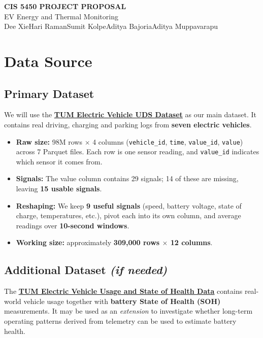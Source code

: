 \documentclass[11pt,letterpaper]{article}
\newcommand{\weblink}[2]{\href{#1}{\underline{#2}}}
\begin{document}
\thispagestyle{fancy}
\begin{center}
  {\LARGE\bfseries CIS 5450 PROJECT PROPOSAL}\\[4pt]
  {\large EV Energy and Thermal Monitoring}\\[4pt]
  Dee Xie\enspace{\textbar}\enspace Hari Raman\enspace{\textbar}\enspace Sumit Kolpe\enspace{\textbar}\enspace Aditya Bajoria\enspace{\textbar}\enspace Aditya Muppavarapu
\end{center}
\vspace{4pt}

\section{Data Source}

\subsection{Primary Dataset}
We will use the \weblink{https://github.com/TUMFTM/electric-vehicle-uds-dataset}{\textbf{TUM Electric Vehicle UDS Dataset}} as our main dataset. It contains real driving, charging and parking logs from \textbf{seven electric vehicles}.

\begin{itemize}
  \item \textbf{Raw size:} 98M rows $\times$ 4 columns (\texttt{vehicle\_id}, \texttt{time}, \texttt{value\_id}, \texttt{value}) across 7 Parquet files. Each row is one sensor reading, and \texttt{value\_id} indicates which sensor it comes from.
  \item \textbf{Signals:} The value column contains 29 signals; 14 of these are missing, leaving \textbf{15 usable signals}.
  \item \textbf{Reshaping:} We keep \textbf{9 useful signals} (speed, battery voltage, state of charge, temperatures, etc.), pivot each into its own column, and average readings over \textbf{10-second windows}.
  \item \textbf{Working size:} approximately \textbf{309,000 rows $\times$ 12 columns}.
\end{itemize}

\subsection{Additional Dataset \textit{\textmd{(if needed)}}}
The \weblink{https://data.gov.de/suche/daten/electric-vehicle-usage-and-state-of-health-dataf7e88}{\textbf{TUM Electric Vehicle Usage and State of Health Data}} contains real-world vehicle usage together with \textbf{battery State of Health (SOH)} measurements. It may be used as an \textit{extension} to investigate whether long-term operating patterns derived from telemetry can be used to estimate battery health.
\end{document}

